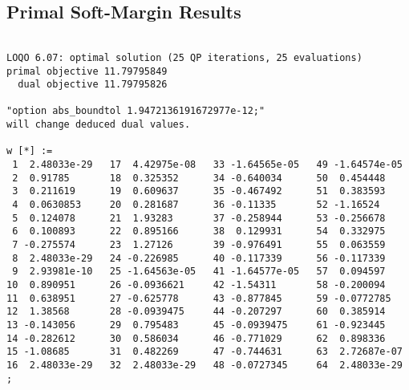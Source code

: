 \documentclass{article}
\begin{document}
\subsection{Primal Soft-Margin Results}

\begin{verbatim}

LOQO 6.07: optimal solution (25 QP iterations, 25 evaluations)
primal objective 11.79795849
  dual objective 11.79795826

"option abs_boundtol 1.9472136191672977e-12;"
will change deduced dual values.

w [*] :=
 1  2.48033e-29   17  4.42975e-08   33 -1.64565e-05   49 -1.64574e-05
 2  0.91785       18  0.325352      34 -0.640034      50  0.454448
 3  0.211619      19  0.609637      35 -0.467492      51  0.383593
 4  0.0630853     20  0.281687      36 -0.11335       52 -1.16524
 5  0.124078      21  1.93283       37 -0.258944      53 -0.256678
 6  0.100893      22  0.895166      38  0.129931      54  0.332975
 7 -0.275574      23  1.27126       39 -0.976491      55  0.063559
 8  2.48033e-29   24 -0.226985      40 -0.117339      56 -0.117339
 9  2.93981e-10   25 -1.64563e-05   41 -1.64577e-05   57  0.094597
10  0.890951      26 -0.0936621     42 -1.54311       58 -0.200094
11  0.638951      27 -0.625778      43 -0.877845      59 -0.0772785
12  1.38568       28 -0.0939475     44 -0.207297      60  0.385914
13 -0.143056      29  0.795483      45 -0.0939475     61 -0.923445
14 -0.282612      30  0.586034      46 -0.771029      62  0.898336
15 -1.08685       31  0.482269      47 -0.744631      63  2.72687e-07
16  2.48033e-29   32  2.48033e-29   48 -0.0727345     64  2.48033e-29
;


\end{verbatim}
\end{document}
